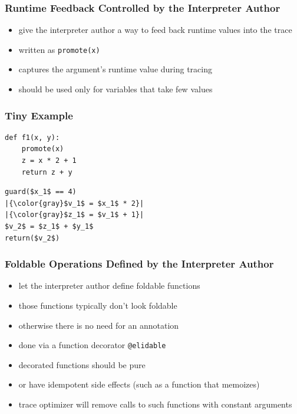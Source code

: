 \documentclass[utf8x]{beamer}
\newcommand{\noop}{}
\begin{document}
\begin{frame}[containsverbatim]
  \frametitle{Runtime Feedback Controlled by the Interpreter Author}
  \begin{itemize}
      \item give the interpreter author a way to feed back runtime values into the trace
      \item written as \texttt{promote(x)}
      \item captures the argument's runtime value during tracing
      \item should be used only for variables that take few values
  \end{itemize}
  \pause
\end{frame}

\begin{frame}[containsverbatim]
  \frametitle{Tiny Example}
  \begin{minipage}[b]{6cm}
      \centering
      {\noop
      \begin{lstlisting}[mathescape,basicstyle=\ttfamily]
def f1(x, y):
    promote(x)
    z = x * 2 + 1
    return z + y
      \end{lstlisting}
      }
  \end{minipage}
  \vline
  \hspace{0.5cm}
  \begin{minipage}[b]{4cm}
      {\noop
      \begin{lstlisting}[mathescape,escapechar=|,basicstyle=\ttfamily]
guard($x_1$ == 4)
|{\color{gray}$v_1$ = $x_1$ * 2}|
|{\color{gray}$z_1$ = $v_1$ + 1}|
$v_2$ = $z_1$ + $y_1$
return($v_2$)
      \end{lstlisting}
      }
  \end{minipage}
\end{frame}

\begin{frame}
  \frametitle{Foldable Operations Defined by the Interpreter Author}
  \begin{itemize}
      \item let the interpreter author define foldable functions
      \item those functions typically don't look foldable
      \item otherwise there is no need for an annotation
      \item done via a function decorator \texttt{@elidable}
      \pause
      \item decorated functions should be pure
      \item or have idempotent side effects (such as a function that memoizes)
      \item trace optimizer will remove calls to such functions with constant arguments
  \end{itemize}
\end{frame}
\end{document}
